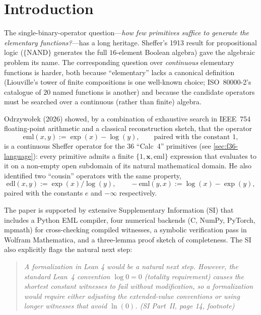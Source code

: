 \documentclass[11pt,a4paper]{article}
\newcommand{\eml}{\mathrm{eml}}
\newcommand{\edl}{\mathrm{edl}}
\theoremstyle{plain}
\theoremstyle{definition}
\begin{document}
\section{Introduction}
\label{sec:intro}

The single-binary-operator question---\emph{how few primitives suffice
to generate the elementary functions?}---has a long heritage. Sheffer's
1913 result for propositional logic
($\{\mathrm{NAND}\}$ generates the full $16$-element Boolean algebra)
gave the algebraic problem its name. The corresponding question over
\emph{continuous} elementary functions is harder, both because
``elementary'' lacks a canonical definition (Liouville's tower of
finite compositions is one well-known choice; ISO~80000-2's catalogue
of $20$ named functions is another) and because the candidate
operators must be searched over a continuous (rather than finite)
algebra.

Odrzywołek (2026) \cite{odrzywolek2026eml} showed, by a combination of
exhaustive search in IEEE~754 floating-point arithmetic and a
classical reconstruction sketch, that the operator
\begin{equation}
    \eml(x, y) := \exp(x) - \log(y),
    \qquad \text{paired with the constant }1,
    \label{eq:eml-def}
\end{equation}
is a continuous Sheffer operator for the $36$ ``Calc~4'' primitives
(see \cref{sec:f36-language}): every primitive admits a finite
$\{1, \mathbf{x}, \eml\}$ expression that evaluates to it on a non-empty
open subdomain of its natural mathematical domain. He also identified
two ``cousin'' operators with the same property,
\begin{equation}
    \edl(x, y) := \exp(x)/\log(y),
    \qquad
    -\eml(y, x) := \log(x) - \exp(y),
    \label{eq:cousins}
\end{equation}
paired with the constants $e$ and $-\infty$ respectively.

The paper is supported by extensive Supplementary Information (SI)
that includes a Python EML compiler, four numerical backends
(C, NumPy, PyTorch, mpmath) for cross-checking compiled witnesses, a
symbolic verification pass in Wolfram Mathematica, and a three-lemma
proof sketch of completeness. The SI also explicitly flags the natural
next step:

\begin{quote}\itshape
A formalization in Lean 4 \cite{leanprover2021} would be a natural next
step. However, the standard Lean~4 convention $\log 0 = 0$ (totality
requirement) causes the shortest constant witnesses to fail without
modification, so a formalization would require either adjusting the
extended-value conventions or using longer witnesses that avoid
$\ln(0)$.
\hfill (SI Part~II, page 14, footnote)
\end{quote}
\end{document}
